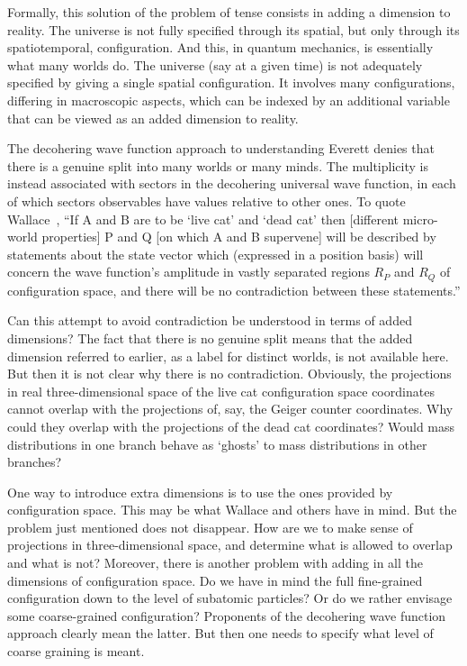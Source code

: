 \documentclass[12pt]{article}
\begin{document}
Formally, this solution of the problem of tense
consists in adding a dimension to reality.  The
universe is not fully specified through its
spatial, but only through its spatiotemporal,
configuration.  And this, in quantum mechanics,
is essentially what many worlds do.  The universe
(say at a given time) is not adequately specified
by giving a single spatial configuration.  It
involves many configurations, differing in
macroscopic aspects, which can be indexed by an
additional variable that can be viewed as an added
dimension to reality.

The decohering wave function approach to
understanding Everett denies that there is a
genuine split into many worlds or many minds.
The multiplicity is instead associated with
sectors in the decohering universal wave
function, in each of which sectors observables
have values relative to other ones.
To quote Wallace~\cite{wallace2},
``If A and B are to be `live cat' and `dead cat'
then [different micro-world properties] P and Q
[on which A and B supervene] will be described
by statements about the state vector which
(expressed in a position basis) will concern the
wave function's amplitude in vastly separated
regions $R_P$ and $R_Q$ of configuration space, and
there will be no contradiction between these
statements.''

Can this attempt to avoid contradiction be
understood in terms of
added dimensions?  The fact that there is no
genuine split means that the added dimension
referred to earlier, as a label for distinct
worlds, is not available here.  But then it is
not clear why there is no contradiction.
Obviously, the projections in real
three-dimensional space of the live cat
configuration space coordinates cannot overlap
with the projections of, say, the Geiger
counter coordinates.  Why could they overlap
with the projections of the dead cat
coordinates?  Would mass distributions in one
branch behave as `ghosts' to mass distributions in
other branches?

One way to introduce extra dimensions is to use
the ones provided by configuration space.  This
may be what Wallace and others have in mind.
But the problem just mentioned does not disappear.
How are we to make sense of projections in
three-dimensional space, and determine what is
allowed to overlap and what is not?  Moreover,
there is another problem with adding in all the
dimensions of configuration space.  Do we have in
mind the full fine-grained configuration down to
the level of subatomic particles?  Or do we rather
envisage some coarse-grained configuration?
Proponents of the decohering wave function
approach clearly mean the latter.  But then one needs
to specify what level of coarse graining is meant.
\end{document}
